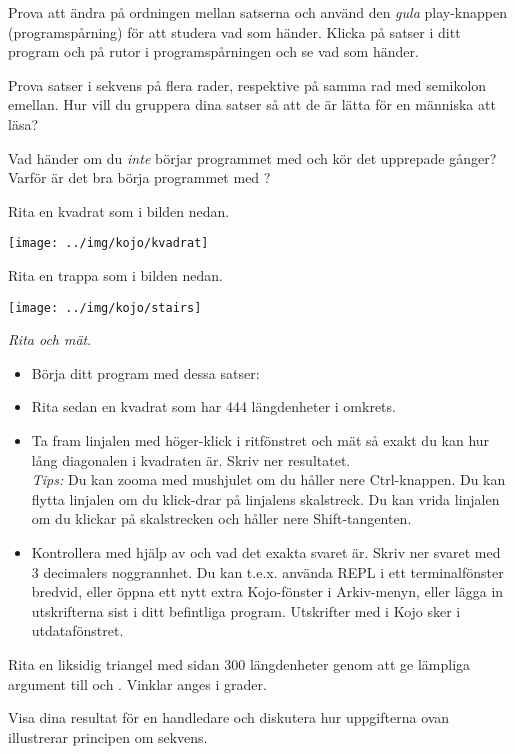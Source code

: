 \Subtask Prova att ändra på ordningen mellan satserna och använd den \emph{gula} play-knappen  (programspårning) för att studera vad som händer. Klicka på satser i ditt program och på rutor i programspårningen och se vad som händer.

\Subtask Prova satser i sekvens på flera rader, respektive på samma rad med semikolon emellan. Hur vill du gruppera dina satser så att de är lätta för en människa att läsa?

\Subtask\Pen Vad händer om du \emph{inte} börjar programmet med  och kör det upprepade gånger? Varför är det bra börja programmet med ?

\Subtask Rita en kvadrat som i bilden nedan.

\texttt{[image: ../img/kojo/kvadrat]}

\Subtask Rita en trappa som i bilden nedan.

\texttt{[image: ../img/kojo/stairs]}

\Subtask \emph{Rita och mät}.
\begin{itemize}[noitemsep]
\item Börja ditt program med dessa satser:\\ 
\item Rita sedan en kvadrat som har 444 längdenheter i omkrets.
\item Ta fram linjalen med höger-klick i ritfönstret och mät så exakt du kan hur lång diagonalen i kvadraten är. Skriv ner resultatet. \\ \emph{Tips:} Du kan zooma med mushjulet om du håller nere Ctrl-knappen. Du kan flytta linjalen om du klick-drar på linjalens skalstreck. Du kan vrida linjalen om du klickar på skalstrecken och håller nere Shift-tangenten.
\item Kontrollera med hjälp av  och  vad det exakta svaret är. Skriv ner svaret med 3 decimalers noggrannhet. Du kan t.e.x. använda REPL i ett terminalfönster bredvid, eller öppna ett nytt extra Kojo-fönster i Arkiv-menyn, eller lägga in utskrifterna sist i ditt befintliga program. Utskrifter med  i Kojo sker i utdatafönstret. 
\end{itemize}

\Subtask Rita en liksidig triangel med sidan 300 längdenheter genom att ge lämpliga argument till  och . Vinklar anges i grader.

\Subtask\Checkpoint Visa dina resultat för en handledare och diskutera hur uppgifterna ovan illustrerar principen om sekvens.

